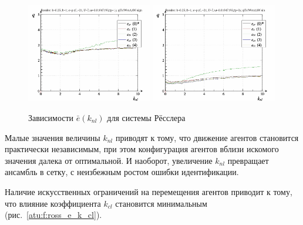 \begin{figure}[ht!]
\begin{center}
  \includegraphics[width=0.49\textwidth]{p/cha/ross/ross_id-p_k_nl_ql3rlWvnAAW_sign.png}
  \hfill
  \includegraphics[width=0.49\textwidth]{p/cha/ross/ross_id-p_k_nl_ql3rlWvnAAW_sin.png}
\end{center}
  \caption{Зависимости $\bar{e}(k_{nl})$ для системы Рёсслера}
\label{atu:f:ross_e_k_nl}
\end{figure}

Малые значения величины $k_{nl}$ приводят к тому, что движение
агентов становится практически независимым, при этом конфигурация
агентов вблизи искомого значения далека от оптимальной.
И наоборот, увеличение $k_{nl}$ превращает ансамбль в сетку,
с неизбежным ростом ошибки идентификации.

Наличие искусственных ограничений на перемещения агентов
приводит к тому, что влияние коэффициента $k_{cl}$
становится минимальным (рис.~\ref{atu:f:ross_e_k_cl}).

